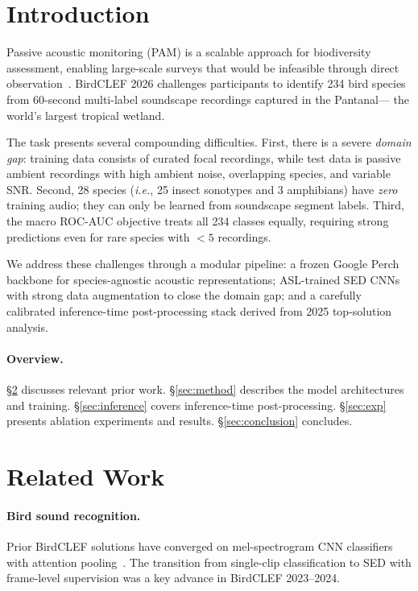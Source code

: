 \documentclass[10pt,twocolumn]{article}
\newcommand{\ie}{\emph{i.e.},\xspace}
\newcommand{\secref}[1]{\S\ref{#1}}
\begin{document}
\section{Introduction}
\label{sec:intro}

Passive acoustic monitoring (PAM) is a scalable approach for biodiversity
assessment, enabling large-scale surveys that would be infeasible through
direct observation~\cite{bioacoustics2022}.
BirdCLEF 2026 challenges participants to identify 234 bird species from
60-second multi-label soundscape recordings captured in the Pantanal—
the world's largest tropical wetland.

The task presents several compounding difficulties.
First, there is a severe \emph{domain gap}: training data consists of
curated focal recordings, while test data is passive ambient recordings
with high ambient noise, overlapping species, and variable SNR.
Second, 28 species (\ie 25 insect sonotypes and 3 amphibians) have
\emph{zero} training audio; they can only be learned from soundscape
segment labels.
Third, the macro ROC-AUC objective treats all 234 classes equally,
requiring strong predictions even for rare species with $<5$ recordings.

We address these challenges through a modular pipeline:
a frozen Google Perch backbone for species-agnostic acoustic representations;
ASL-trained SED CNNs with strong data augmentation to close the domain gap;
and a carefully calibrated inference-time post-processing stack derived
from 2025 top-solution analysis.

\paragraph{Overview.}
\secref{sec:related} discusses relevant prior work.
\secref{sec:method} describes the model architectures and training.
\secref{sec:inference} covers inference-time post-processing.
\secref{sec:exp} presents ablation experiments and results.
\secref{sec:conclusion} concludes.

\section{Related Work}
\label{sec:related}

\paragraph{Bird sound recognition.}
Prior BirdCLEF solutions have converged on mel-spectrogram CNN classifiers
with attention pooling~\cite{kahl2021birdnet}.
The transition from single-clip classification to SED with frame-level
supervision was a key advance in BirdCLEF 2023--2024.
\end{document}
